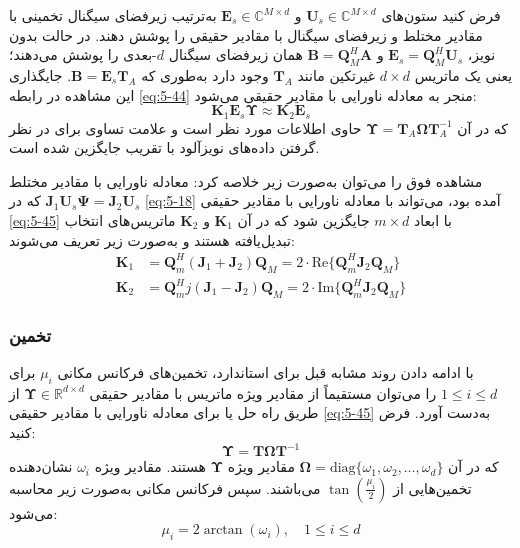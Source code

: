 فرض کنید ستون‌های $\bm{U}_s \in \mathbb{C}^{M \times d}$ و $\bm{E}_s \in \mathbb{C}^{M \times d}$ به‌ترتیب زیرفضای سیگنال تخمینی با مقادیر مختلط و زیرفضای سیگنال با مقادیر حقیقی را پوشش دهند. در حالت بدون نویز، $\bm{E}_s = \bm{Q}_M^H \bm{U}_s$ و $\bm{B} = \bm{Q}_M^H \bm{A}$ همان زیرفضای سیگنال $d$-بعدی را پوشش می‌دهند؛ یعنی یک ماتریس $d \times d$ غیرتکین مانند $\bm{T}_A$ وجود دارد به‌طوری که $\bm{B} = \bm{E}_s \bm{T}_A$. جایگذاری این مشاهده در رابطه \eqref{eq:5-44} منجر به معادله ناورایی با مقادیر حقیقی می‌شود:
\begin{equation}
	\bm{K}_1 \bm{E}_s \bm{\Upsilon} \approx \bm{K}_2 \bm{E}_s
	\label{eq:5-45}
\end{equation}
که در آن $\bm{\Upsilon} = \bm{T}_A \bm{\Omega} \bm{T}_A^{-1}$ حاوی اطلاعات  مورد نظر است و علامت تساوی برای در نظر گرفتن داده‌های نویزآلود با تقریب جایگزین شده است.

مشاهده فوق را می‌توان به‌صورت زیر خلاصه کرد: معادله ناورایی با مقادیر مختلط $\bm{J}_1 \bm{U}_s \bm{\Psi} = \bm{J}_2 \bm{U}_s$ که در \eqref{eq:5-18} آمده بود، می‌تواند با معادله ناورایی با مقادیر حقیقی \eqref{eq:5-45} با ابعاد $m \times d$ جایگزین شود که در آن $\bm{K}_1$ و $\bm{K}_2$ ماتریس‌های انتخاب تبدیل‌یافته هستند و به‌صورت زیر تعریف می‌شوند:
\begin{equation}
	\label{eq:5-46}
	\begin{aligned}
		\bm{K}_1 &= \bm{Q}_m^H (\bm{J}_1 + \bm{J}_2) \bm{Q}_M = 2 \cdot \text{Re}\{ \bm{Q}_m^H \bm{J}_2 \bm{Q}_M \} \\
		\bm{K}_2 &= \bm{Q}_m^H j(\bm{J}_1 - \bm{J}_2) \bm{Q}_M = 2 \cdot \text{Im}\{ \bm{Q}_m^H \bm{J}_2 \bm{Q}_M \}
	\end{aligned}
\end{equation}




\subsubsection{تخمین }
\label{subsubsec:5-5-1-3}
با ادامه دادن روند مشابه قبل برای  استاندارد، تخمین‌های فرکانس مکانی $\mu_i$ برای $1 \leq i \leq d$ را می‌توان مستقیماً از مقادیر ویژه ماتریس با مقادیر حقیقی $\bm{\Upsilon} \in \mathbb{R}^{d \times d}$ از طریق راه حل  یا  برای معادله ناورایی با مقادیر حقیقی \eqref{eq:5-45} به‌دست آورد. فرض کنید:
\begin{equation}
	\bm{\Upsilon} = \bm{T}\bm{\Omega}\bm{T}^{-1}
	\label{eq:5-47}
\end{equation}
که در آن $\bm{\Omega} = \text{diag}\{\omega_1, \omega_2, \dots, \omega_d\}$ مقادیر ویژه $\bm{\Upsilon}$ هستند. مقادیر ویژه $\omega_i$ نشان‌دهنده تخمین‌هایی از $\tan(\frac{\mu_i}{2})$ می‌باشند. سپس فرکانس مکانی به‌صورت زیر محاسبه می‌شود:
\begin{equation}
	\mu_i = 2 \arctan(\omega_i), \quad 1 \leq i \leq d
	\label{eq:5-48}
\end{equation}

